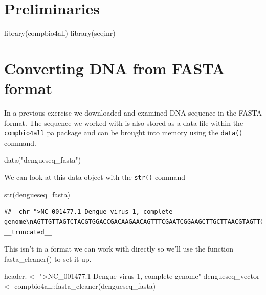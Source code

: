 \documentclass[
]{book}
\newenvironment{Shaded}{\begin{snugshade}}{\end{snugshade}}
\newcommand{\FunctionTok}[1]{\textcolor[rgb]{0.00,0.00,0.00}{#1}}
\newcommand{\NormalTok}[1]{#1}
\newcommand{\OtherTok}[1]{\textcolor[rgb]{0.56,0.35,0.01}{#1}}
\newcommand{\SpecialCharTok}[1]{\textcolor[rgb]{0.00,0.00,0.00}{#1}}
\newcommand{\StringTok}[1]{\textcolor[rgb]{0.31,0.60,0.02}{#1}}
\begin{document}
\hypertarget{preliminaries}{%
\section{Preliminaries}\label{preliminaries}}

\begin{Shaded}
\begin{Highlighting}[]
\FunctionTok{library}\NormalTok{(compbio4all)}
\FunctionTok{library}\NormalTok{(seqinr)}
\end{Highlighting}
\end{Shaded}

\hypertarget{converting-dna-from-fasta-format}{%
\section{Converting DNA from FASTA format}\label{converting-dna-from-fasta-format}}

In a previous exercise we downloaded and examined DNA sequence in the FASTA format. The sequence we worked with is also stored as a data file within the \texttt{compbio4all} pa package and can be brought into memory using the \texttt{data()} command.

\begin{Shaded}
\begin{Highlighting}[]
\FunctionTok{data}\NormalTok{(}\StringTok{"dengueseq\_fasta"}\NormalTok{)}
\end{Highlighting}
\end{Shaded}

We can look at this data object with the \texttt{str()} command

\begin{Shaded}
\begin{Highlighting}[]
\FunctionTok{str}\NormalTok{(dengueseq\_fasta)}
\end{Highlighting}
\end{Shaded}

\begin{verbatim}
##  chr ">NC_001477.1 Dengue virus 1, complete genome\nAGTTGTTAGTCTACGTGGACCGACAAGAACAGTTTCGAATCGGAAGCTTGCTTAACGTAGTTCTA"| __truncated__
\end{verbatim}

This isn't in a format we can work with directly so we'll use the function fasta\_cleaner() to set it up.

\begin{Shaded}
\begin{Highlighting}[]
\NormalTok{header. }\OtherTok{\textless{}{-}} \StringTok{"\textgreater{}NC\_001477.1 Dengue virus 1, complete genome"}
\NormalTok{dengueseq\_vector }\OtherTok{\textless{}{-}}\NormalTok{ compbio4all}\SpecialCharTok{::}\FunctionTok{fasta\_cleaner}\NormalTok{(dengueseq\_fasta)}
\end{Highlighting}
\end{Shaded}
\end{document}
